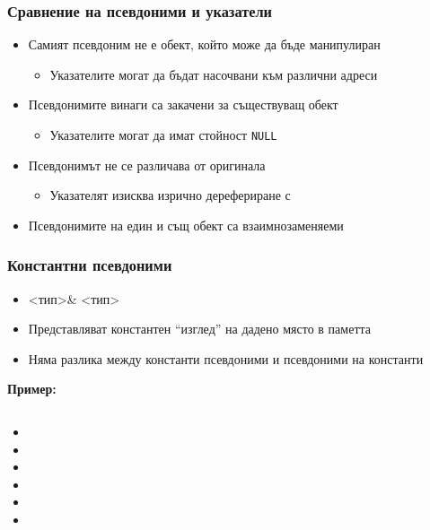 \documentclass{beamer}
\begin{document}
\begin{frame}
  \frametitle{Сравнение на псевдоними и указатели}

  \begin{itemize}[<+->]
  \item Самият псевдоним не е обект, който може да бъде манипулиран
    \begin{itemize}
    \item Указателите могат да бъдат насочвани към различни адреси
    \end{itemize}
  \item Псевдонимите винаги са закачени за съществуващ обект
    \begin{itemize}
    \item Указателите могат да имат стойност \tt{NULL}
    \end{itemize}
  \item Псевдонимът не се различава от оригинала
    \begin{itemize}
    \item Указателят изисква изрично дерефериране с \tt*
    \end{itemize}
  \item Псевдонимите на един и същ обект са взаимнозаменяеми
  \end{itemize}
\end{frame}

\begin{frame}
  \frametitle{Константни псевдоними}

  \begin{itemize}[<+->]
  \item {}<тип>\tta\& \eqv <тип>
  \item Представляват константен ``изглед'' на дадено място в паметта
  \item Няма разлика между константи псевдоними и псевдоними на константи
  \end{itemize}
  \onslide<+->
  \textbf{Пример:}
  \begin{columns}[T,onlytextwidth]
    \begin{column}{.5\textwidth}
      \begin{itemize}[<+->]
      \item {}
      \item {}
      \item {}
      \item {}
      \item {}
      \item {}
      \end{itemize}
    \end{column}
    \begin{column}{.5\textwidth}
    \end{column}
  \end{columns}
\end{frame}
\end{document}
